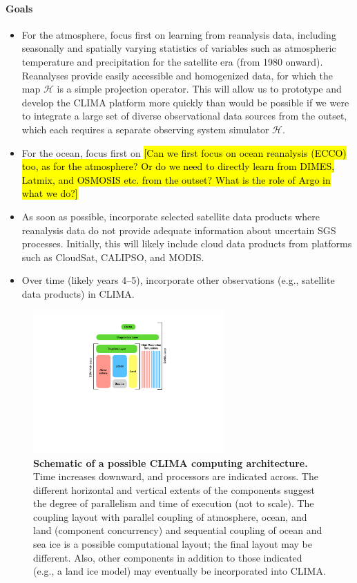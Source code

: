 \documentclass{article}
\begin{document}
\paragraph{Goals}
\begin{itemize}
    \item For the atmosphere, focus first on learning from reanalysis data, including seasonally and spatially varying statistics of variables such as atmospheric temperature and precipitation for the satellite era (from 1980 onward). Reanalyses provide easily accessible and homogenized data, for which the map $\mathcal{H}$ is a simple projection operator. This will allow us to prototype and develop the CLIMA platform more quickly than would be possible if we were to integrate a large set of diverse observational data sources from the outset, which each requires a separate observing system simulator $\mathcal{H}$.
    \item For the ocean, focus first on \hl{[Can we first focus on ocean reanalysis (ECCO) too, as for the atmosphere? Or do we need to directly learn from  DIMES, Latmix, and OSMOSIS etc. from the outset? What is the role of Argo in what we do?]}
    \item As soon as possible, incorporate selected satellite data products where reanalysis data do not provide adequate information about uncertain SGS processes. Initially, this will likely include cloud data products from platforms such as CloudSat, CALIPSO, and MODIS.
    \item Over time (likely years 4--5), incorporate other observations (e.g., satellite data products) in CLIMA. 
\end{itemize}

\begin{figure}[htb]
\centerline{\includegraphics[width=0.65\textwidth]{CLIMA-layers.pdf}}
\caption{\textbf{Schematic of a possible CLIMA computing architecture.} Time increases downward, and processors are indicated across. The different horizontal and vertical extents of the components suggest the degree of parallelism and time of execution (not to scale). The coupling layout with parallel coupling of atmosphere, ocean, and land (component concurrency) and sequential coupling of ocean and sea ice is a possible computational layout; the final layout may be different. Also, other components in addition to those indicated (e.g., a land ice model) may eventually be incorporated into CLIMA.}
\label{f:CLIMA-layers}
\end{figure}
\end{document}
